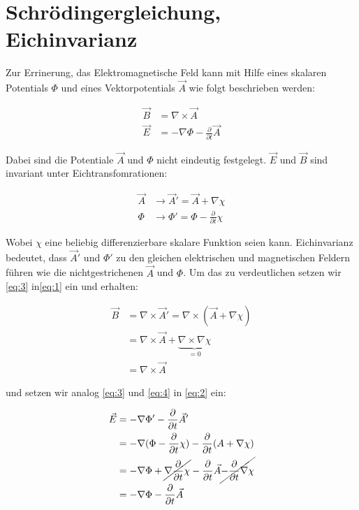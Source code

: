 



\section*{Schrödingergleichung, Eichinvarianz}

Zur Errinerung, das Elektromagnetische Feld kann mit Hilfe eines skalaren Potentials \(\Phi\) und eines Vektorpotentials \(\vec A\) wie folgt beschrieben werden:

\begin{align}
  \vec B &= \nabla \times \vec A   \label{eq:1}\\
 \vec E &= -\nabla\Phi - \frac{\partial }{\partial t}\vec A  \label{eq:2}
\end{align}

Dabei sind die Potentiale \(\vec A\) und \(\Phi\) nicht eindeutig festgelegt. \(\vec E\) und \(\vec B\) sind invariant unter Eichtransfomrationen:

\begin{align}
  \vec A &\rightarrow \vec A' = \vec A+\nabla\chi  \label{eq:3}\\
 \Phi &\rightarrow \Phi' = \Phi - \frac{\partial}{\partial t} \chi \label{eq:4}
\end{align}

Wobei \(\chi\) eine beliebig differenzierbare skalare Funktion seien kann. Eichinvarianz bedeutet, dass \(\vec A'\) und \(\Phi'\) zu den gleichen elektrischen und magnetischen Feldern führen wie die nichtgestrichenen \(\vec A\) und \(\Phi\). Um das zu verdeutlichen setzen wir \eqref{eq:3} in\eqref{eq:1} ein und erhalten:

\begin{align}
  \vec B &= \nabla \times \vec A' = \nabla \times (\vec A+\nabla\chi   )\\
&= \nabla \times \vec A + \underbrace{ \nabla \times \nabla \chi }_{=0}\\
&= \nabla \times \vec A \label{eq:5}
\end{align}

und setzen wir analog \eqref{eq:3} und \eqref{eq:4} in \eqref{eq:2} ein:

\begin{align}
 \vec E &= -\nabla\Phi' - \frac{\partial }{\partial t}\vec A' \\
 &= -\nabla(\Phi - \frac{\partial}{\partial t} \chi ) - \frac{\partial }{\partial t}(  A+\nabla\chi )\\
&= -\nabla\Phi + \cancel{\nabla\frac{\partial}{\partial t} \chi}  - \frac{\partial }{\partial t}  \vec A \cancel{ - \frac{\partial }{\partial t}\nabla\chi}\\
&= -\nabla\Phi - \frac{\partial }{\partial t}  \vec A \label{eq:6}
\end{align}

